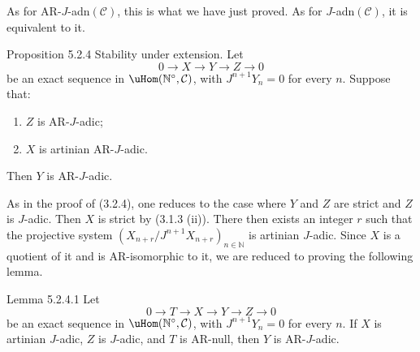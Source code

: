 As for AR-\(J\)-adn\((\mathcal C)\), this is what we have just proved. As for \(J\)-adn\((\mathcal C)\), it is equivalent to it.

\begin{statement}{Proposition 5.2.4}
Stability under extension. Let
\[
0\longrightarrow X\longrightarrow Y\longrightarrow Z\longrightarrow0
\]
be an exact sequence in \(\uHom(\mathbb N^\circ,\mathcal C)\), with \(J^{n+1}Y_n=0\) for every \(n\). Suppose that:
\begin{enumerate}[label=\textup{(\roman*)}]
\item \(Z\) is AR-\(J\)-adic;
\item \(X\) is artinian AR-\(J\)-adic.
\end{enumerate}
Then \(Y\) is AR-\(J\)-adic.
\end{statement}

\begin{prooftext}
As in the proof of (3.2.4), one reduces to the case where \(Y\) and \(Z\) are strict and \(Z\) is \(J\)-adic. Then \(X\) is strict by (3.1.3 (ii)). There then exists an integer \(r\) such that the projective system \((X_{n+r}/J^{n+1}X_{n+r})_{n\in\mathbb N}\) is artinian \(J\)-adic. Since \(X\) is a quotient of it and is AR-isomorphic to it, we are reduced to proving the following lemma.
\end{prooftext}

\begin{statement}{Lemma 5.2.4.1}
Let
\[
0\longrightarrow T\longrightarrow X\longrightarrow Y\longrightarrow Z\longrightarrow0
\]
be an exact sequence in \(\uHom(\mathbb N^\circ,\mathcal C)\), with \(J^{n+1}Y_n=0\) for every \(n\). If \(X\) is artinian \(J\)-adic, \(Z\) is \(J\)-adic, and \(T\) is AR-null, then \(Y\) is AR-\(J\)-adic.
\end{statement}

